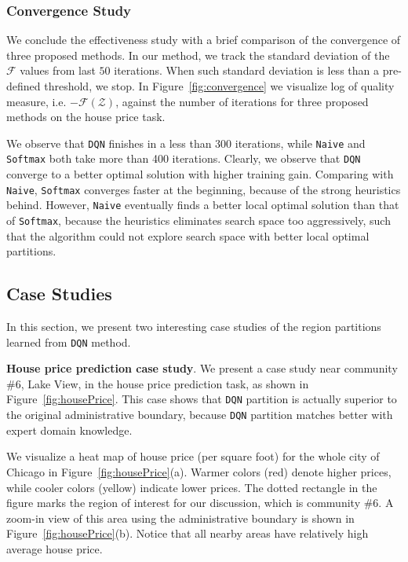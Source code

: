 \subsubsection{Convergence Study}

We conclude the effectiveness study with a brief comparison of the convergence of three proposed methods. In our method, we track the standard deviation of the $\mathcal{F}$ values from last $50$ iterations. When such standard deviation is less than a pre-defined threshold, we stop. In Figure~\ref{fig:convergence} we visualize log of quality measure, i.e. $ - \mathcal{F}(\mathcal{Z})$, against the number of iterations for three proposed methods on the house price task. 

We observe that \texttt{DQN} finishes in a less than 300 iterations, while \texttt{Naive} and \texttt{Softmax} both take more than 400 iterations. Clearly, we observe that \texttt{DQN} converge to a better optimal solution with higher training gain. Comparing with \texttt{Naive},  \texttt{Softmax} converges faster at the beginning, because of the strong heuristics behind. However, \texttt{Naive} eventually finds a better local optimal solution than that of \texttt{Softmax}, because the heuristics eliminates search space too aggressively, such that the algorithm could not explore search space with better local optimal partitions.









\subsection{Case Studies}

In this section, we present two interesting case studies of the region partitions learned from \texttt{DQN} method.

\smallskip
\textbf{House price prediction case study}. We present a case study near community \#6, Lake View, in the house price prediction task, as shown in Figure~\ref{fig:housePrice}. This case shows that \texttt{DQN} partition is actually superior to the original administrative boundary, because  \texttt{DQN} partition matches better with expert domain knowledge.

We visualize a heat map of house price (per square foot) for the whole city of Chicago in Figure~\ref{fig:housePrice}(a). Warmer colors (red) denote higher prices, while cooler colors (yellow) indicate lower prices. The dotted rectangle in the figure marks the region of interest for our discussion, which is community \#6. A zoom-in view of this area using the administrative boundary is shown in Figure~\ref{fig:housePrice}(b). Notice that all nearby areas have relatively high average house price.


